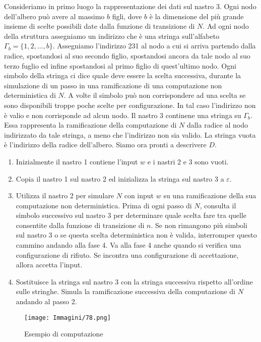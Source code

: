 \documentclass{article}
\begin{document}
Consideriamo in primo luogo la rappresentazione dei dati sul nastro 3.
Ogni nodo dell'albero può avere al massimo $b$ figli, dove $b$ è la dimensione del più grande insieme di scelte possibili date dalla funzione di transizione di $N$.
Ad ogni nodo della struttura assegniamo un indirizzo che è una stringa sull'alfabeto $\Gamma_b = \{1,2,...,b\}$.
Assegniamo l'indirizzo 231 al nodo a cui si arriva partendo dalla radice, spostandosi al suo secondo figlio, spostandosi ancora da tale nodo al suo terzo fuglio ed infine spostandosi al primo figlio di quest'ultimo nodo.
Ogni simbolo della stringa ci dice quale deve essere la scelta successiva, durante la simulazione di un passo in una ramificazione di una computazione non deterministica di $N$.
A volte il simbolo può non corrispondere ad una scelta se sono disponibili troppe poche scelte per configurazione.
In tal caso l'indirizzo non è valio e non corrisponde ad alcun nodo.
Il nastro 3 continene una stringa su $\Gamma_b$.
Essa rappresenta la ramificazione della computazione di $N$ dalla radice al nodo indirizzato da tale stringa, a meno che l'indirizzo non sia valido.
La stringa vuota è l'indirizzo della radice dell'albero.
Siamo ora pronti a descrivere $D$.
\begin{enumerate}
    \item Inizialmente il nastro 1 contiene l'input $w$ e i nastri 2 e 3 sono vuoti.
    \item Copia il nastro 1 sul nastro 2 ed inizializza la stringa sul nastro 3 a $\varepsilon$.
    \item Utilizza il nastro 2 per simulare $N$ con input $w$ su una ramificazione della sua computazione non deterministica. Prima di ogni passo di $N$, consulta il simbolo successivo sul nastro 3 per determinare quale scelta fare tra quelle consentite dalla funzione di transizione di $n$. Se non rimangono più simboli sul nastro 3 o se questa scelta deterministica non è valida, interromper questo cammino andando alla fase 4. Va alla fase 4 anche quando si verifica una configurazione di rifiuto. Se incontra una configurazione di accettazione, allora accetta l'input.
    \item Sostituisce la stringa sul nastro 3 con la stringa successiva rispetto all'ordine sulle stringhe. Simula la ramificazione successiva della computazione di $N$ andando al passo 2.
\end{enumerate}

\begin{figure}[H]
    \centering
    \texttt{[image: Immagini/78.png]}
    \caption{Esempio di computazione}
    \label{fig:nuova_immagine}
\end{figure}
\end{document}
